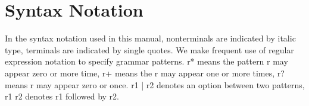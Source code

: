 \section{Syntax Notation}


In the syntax notation used in this manual, nonterminals are indicated by italic type, terminals are 
indicated by single quotes. We make frequent use of regular expression notation to specify grammar 
patterns. r* means the pattern r may appear zero or more time, r+ means the r may appear one or more 
times, r? means r may appear zero or once. r1 | r2 denotes an option between two patterns, r1 r2 denotes 
r1 followed by r2. 
